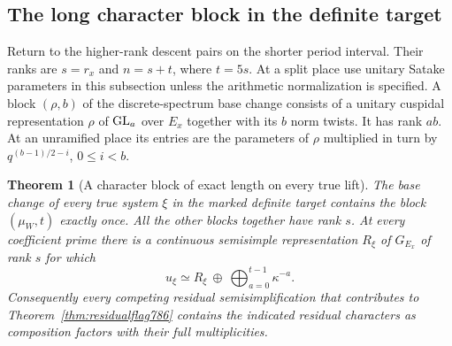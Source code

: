 \documentclass[a4paper,11pt]{article}
\newtheorem{theorem}[proposition]{Theorem}
\theoremstyle{definition}
\theoremstyle{remark}
\numberwithin{equation}{section}
\begin{document}
\subsection{The long character block in the definite target}
\label{sec:longblock787}
Return to the higher-rank descent pairs on the shorter
period interval. Their ranks are \(s=r_x\) and \(n=s+t\),
where \(t=5s\). At a split place use unitary Satake
parameters in this subsection unless the arithmetic
normalization is specified. A block \((\rho,b)\) of
the discrete-spectrum base change consists of a unitary
cuspidal representation \(\rho\) of \({\rm GL}_a\)
over \(E_x\) together with its \(b\) norm twists. It
has rank \(ab\). At an unramified place its entries
are the parameters of \(\rho\) multiplied in turn
by \(q^{(b-1)/2-i}\), \(0\le i<b\).

\begin{theorem}[A character block of exact length on every true lift]
\leavevmode\label{thm:longcharacter787}
The base change of every true system \(\xi\) in the
marked definite target contains the block
\((\mu_W,t)\) exactly once. All the other blocks
together have rank \(s\). At every coefficient prime
there is a continuous semisimple representation
\(R_\xi\) of \(G_{E_x}\) of rank \(s\) for which
\[
             u_\xi \simeq R_\xi\ \oplus\
                     \bigoplus_{a=0}^{t-1}\kappa^{-a}.
\]
Consequently every competing residual semisimplification
that contributes to Theorem~\ref{thm:residualflag786}
contains the indicated residual characters as composition
factors with their full multiplicities.
\end{theorem}
\end{document}
